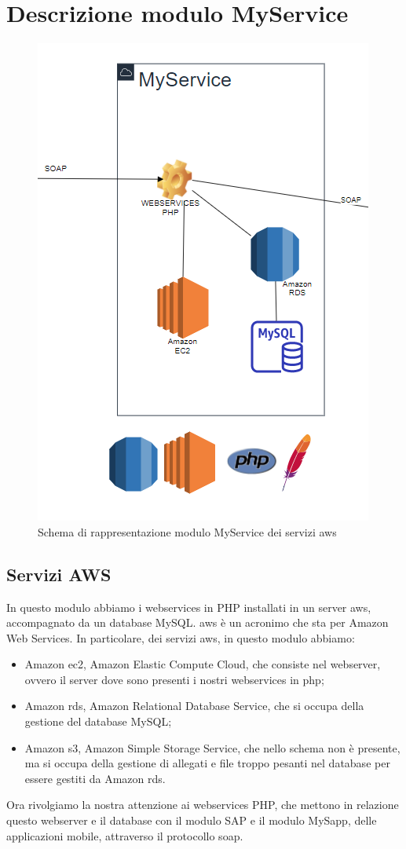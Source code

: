 \section{Descrizione modulo MyService}
\begin{figure}[!h] 
	\centering 
	\includegraphics[scale = 1.1]{immagini/modulo-myservice.png} 
	\caption{Schema di rappresentazione modulo MyService dei servizi \gls{aws}}
	\label{fig:2-12}
\end{figure}
\newpage
\subsection{Servizi AWS}
In questo modulo abbiamo i webservices in PHP installati in un server \gls{aws}, accompagnato da un database MySQL.
\gls{aws} è un acronimo che sta per Amazon Web Services.
In particolare, dei servizi \gls{aws}, in questo modulo abbiamo:
\begin{itemize}
	\item Amazon \gls{ec2}, Amazon Elastic Compute Cloud, che consiste nel webserver, ovvero il server dove sono presenti i nostri webservices in php;
	\item Amazon \gls{rds}, Amazon Relational Database Service, che si occupa della gestione del database MySQL;
	\item Amazon \gls{s3}, Amazon Simple Storage Service, che nello schema non è presente, ma si occupa della gestione di allegati e file troppo pesanti nel database per essere gestiti da Amazon \gls{rds}.
\end{itemize}
Ora rivolgiamo la nostra attenzione ai webservices PHP, che mettono in relazione questo webserver e il database con il modulo SAP e il modulo MySapp, delle applicazioni mobile, attraverso il protocollo \gls{soap}.
